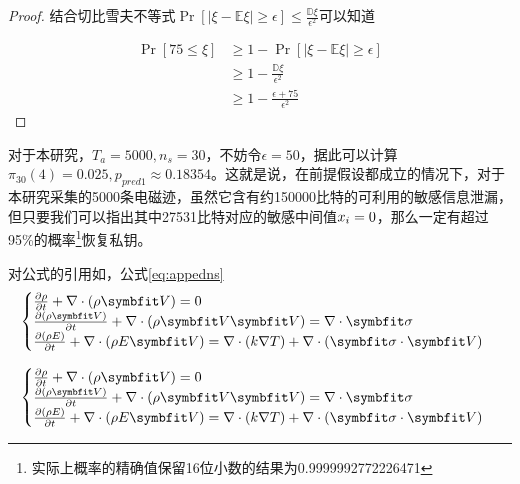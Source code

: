 {\begin{proof}
	结合切比雪夫不等式$\Pr\left[\vert \xi-\mathbb E\xi\vert\ge\epsilon\right]\le \frac{\mathbb D\xi}{\epsilon^2}$可以知道
	
	\begin{align*}
		\Pr\left[75\le\xi\right]&\ge1-\Pr\left[\vert \xi-\mathbb E\xi\vert\ge\epsilon\right]\\
		&\ge 1-\frac{\mathbb D\xi}{\epsilon^2}\\
		&\ge1-\frac{\epsilon+75}{\epsilon^2}
	\end{align*}

	\end{proof}
	对于本研究，$T_a=5000,n_s=30$，不妨令$\epsilon=50$，据此可以计算$\pi_{30}(4)=0.025,p_{pred1}\approx0.18354$。这就是说，在前提假设都成立的情况下，对于本研究采集的5000条电磁迹，虽然它含有约150000比特的可利用的敏感信息泄漏，但只要我们可以指出其中27531比特对应的敏感中间值$x_i=0$，那么一定有超过95\%的概率\footnote{实际上概率的精确值保留16位小数的结果为0.9999992772226471}恢复私钥。
		

对公式的引用如，公式\eqref{eq:appedns}
\begin{equation} \label{eq:appedns}
    \begin{cases}
        \frac{\partial \rho}{\partial t} + \nabla\cdot(\rho\Vector{V}) = 0\\
        \frac{\partial (\rho\Vector{V})}{\partial t} + \nabla\cdot(\rho\Vector{V}\Vector{V}) = \nabla\cdot\Tensor{\sigma}\\
        \frac{\partial (\rho E)}{\partial t} + \nabla\cdot(\rho E\Vector{V}) = \nabla\cdot(k\nabla T) + \nabla\cdot(\Tensor{\sigma}\cdot\Vector{V})
    \end{cases}
\end{equation}

\begin{equation} \label{eq:appedns2}
    \begin{cases}
        \frac{\partial \rho}{\partial t} + \nabla\cdot(\rho\Vector{V}) = 0\\
        \frac{\partial (\rho\Vector{V})}{\partial t} + \nabla\cdot(\rho\Vector{V}\Vector{V}) = \nabla\cdot\Tensor{\sigma}\\
        \frac{\partial (\rho E)}{\partial t} + \nabla\cdot(\rho E\Vector{V}) = \nabla\cdot(k\nabla T) + \nabla\cdot(\Tensor{\sigma}\cdot\Vector{V})
    \end{cases}
\end{equation}


}
